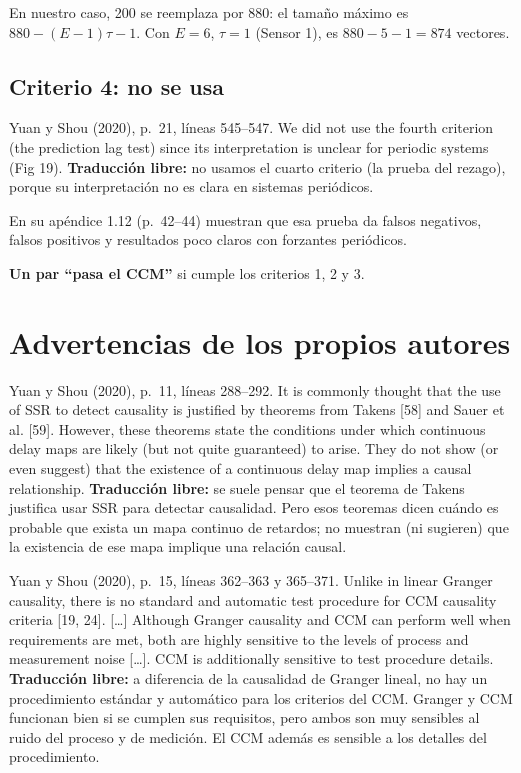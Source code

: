 \documentclass[11pt,openany]{book}
\begin{document}
En nuestro caso, 200 se reemplaza por 880: el tamaño máximo es $880 - (E-1)\tau - 1$. Con $E=6$, $\tau = 1$ (Sensor 1), es $880 - 5 - 1 = 874$ vectores.

\subsection*{Criterio 4: no se usa}

\begin{cita}{Yuan y Shou (2020), p.~21, líneas 545--547.}
We did not use the fourth criterion (the prediction lag test) since its interpretation is unclear for periodic systems (Fig 19).
\tcblower
\textbf{Traducción libre:} no usamos el cuarto criterio (la prueba del rezago), porque su interpretación no es clara en sistemas periódicos.
\end{cita}

En su apéndice 1.12 (p.~42--44) muestran que esa prueba da falsos negativos, falsos positivos y resultados poco claros con forzantes periódicos.

\textbf{Un par ``pasa el CCM''} si cumple los criterios 1, 2 y 3.

\section{Advertencias de los propios autores}

\begin{cita}{Yuan y Shou (2020), p.~11, líneas 288--292.}
It is commonly thought that the use of SSR to detect causality is justified by theorems from Takens [58] and Sauer et al. [59]. However, these theorems state the conditions under which continuous delay maps are likely (but not quite guaranteed) to arise. They do not show (or even suggest) that the existence of a continuous delay map implies a causal relationship.
\tcblower
\textbf{Traducción libre:} se suele pensar que el teorema de Takens justifica usar SSR para detectar causalidad. Pero esos teoremas dicen cuándo es probable que exista un mapa continuo de retardos; no muestran (ni sugieren) que la existencia de ese mapa implique una relación causal.
\end{cita}

\begin{cita}{Yuan y Shou (2020), p.~15, líneas 362--363 y 365--371.}
Unlike in linear Granger causality, there is no standard and automatic test procedure for CCM causality criteria [19, 24]. [\dots] Although Granger causality and CCM can perform well when requirements are met, both are highly sensitive to the levels of process and measurement noise [\dots]. CCM is additionally sensitive to test procedure details.
\tcblower
\textbf{Traducción libre:} a diferencia de la causalidad de Granger lineal, no hay un procedimiento estándar y automático para los criterios del CCM. Granger y CCM funcionan bien si se cumplen sus requisitos, pero ambos son muy sensibles al ruido del proceso y de medición. El CCM además es sensible a los detalles del procedimiento.
\end{cita}
\end{document}
